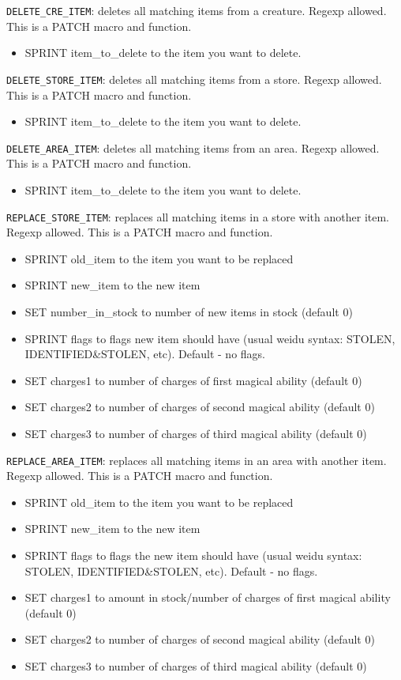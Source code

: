 \documentclass{article}
\begin{document}
\verb+DELETE_CRE_ITEM+: deletes all matching items from a creature. Regexp allowed.
This is a PATCH macro and function.
\begin{itemize}
\item SPRINT item_to_delete to the item you want to delete.
\end{itemize}

\verb+DELETE_STORE_ITEM+: deletes all matching items from a store. Regexp allowed.
This is a PATCH macro and function.
\begin{itemize}
\item SPRINT item_to_delete to the item you want to delete.
\end{itemize}

\verb+DELETE_AREA_ITEM+: deletes all matching items from an area. Regexp allowed.
This is a PATCH macro and function.
\begin{itemize}
\item SPRINT item_to_delete to the item you want to delete.
\end{itemize}

\verb+REPLACE_STORE_ITEM+: replaces all matching items in a store with another item. Regexp allowed.
This is a PATCH macro and function.
\begin{itemize}
\item SPRINT old_item to the item you want to be replaced
\item SPRINT new_item to the new item
\item SET number_in_stock to number of new items in stock (default 0)
\item SPRINT flags to flags new item should have (usual weidu syntax: STOLEN, IDENTIFIED&STOLEN, etc). Default - no flags.
\item SET charges1 to number of charges of first magical ability (default 0)
\item SET charges2 to number of charges of second magical ability (default 0)
\item SET charges3 to number of charges of third magical ability (default 0)
\end{itemize}

\verb+REPLACE_AREA_ITEM+: replaces all matching items in an area with another item. Regexp allowed.
This is a PATCH macro and function.
\begin{itemize}
\item SPRINT old_item to the item you want to be replaced
\item SPRINT new_item to the new item
\item SPRINT flags to flags the new item should have (usual weidu syntax: STOLEN, IDENTIFIED&STOLEN, etc). Default - no flags.
\item SET charges1 to amount in stock/number of charges of first magical ability (default 0)
\item SET charges2 to number of charges of second magical ability (default 0)
\item SET charges3 to number of charges of third magical ability (default 0)
\end{itemize}
\end{document}
